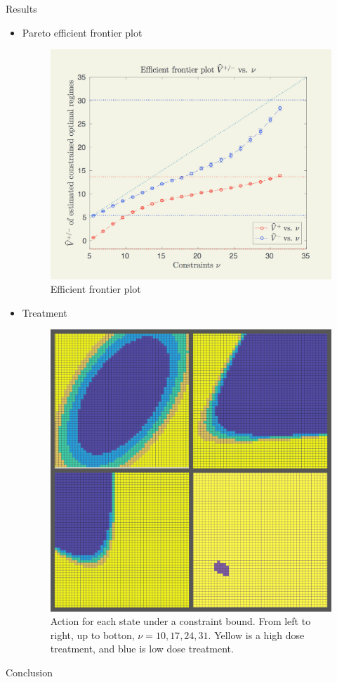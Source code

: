 \documentclass[final,hyperref={pdfpagelabels=false}]{beamer}
\begin{document}
\begin{frame}[t]
\begin{columns}[t]
\begin{column}{.465\textwidth}
\begin{block}{Results}
\begin{itemize}
\item Pareto efficient frontier plot
\begin{figure}
\includegraphics[width=0.7\linewidth]{efficient_plot.png}
\caption{Efficient frontier plot}
\end{figure}
\item Treatment
\begin{figure}
\includegraphics[width=0.5\linewidth]{act_dark.jpg}
\caption{Action for each state under a constraint bound. From left to right, up to botton, $\nu= 10, 17, 24, 31$. Yellow is a high dose treatment, and blue is low dose treatment.}
\end{figure}
\end{itemize}     
\end{block}



\begin{block}{Conclusion}


\end{block}
\end{column}
\end{columns}
\end{frame}
\end{document}
